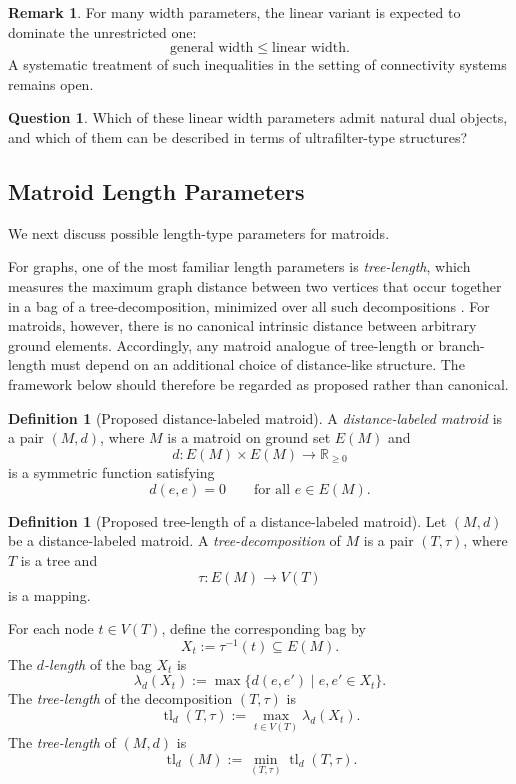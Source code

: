 \documentclass[10pt]{book}
\theoremstyle{definition}
\newtheorem{remark}[theorem]{Remark}
\newtheorem{definition}[theorem]{Definition}
\newtheorem{question}[theorem]{Question}
\begin{document}
\begin{remark}
For many width parameters, the linear variant is expected to dominate the unrestricted one:
\[
\text{general width} \leq \text{linear width}.
\]
A systematic treatment of such inequalities in the setting of connectivity systems remains open.
\end{remark}

\begin{question}
Which of these linear width parameters admit natural dual objects, and which of them can be described in terms of ultrafilter-type structures?
\end{question}

\subsection{Matroid Length Parameters}

We next discuss possible length-type parameters for matroids.

For graphs, one of the most familiar length parameters is \emph{tree-length}, which measures the maximum graph distance between two vertices that occur together in a bag of a tree-decomposition, minimized over all such decompositions \cite{coudert2016approximate,dourisboure2004compact,dourisboure2007spanners}.
For matroids, however, there is no canonical intrinsic distance between arbitrary ground elements.
Accordingly, any matroid analogue of tree-length or branch-length must depend on an additional choice of distance-like structure.
The framework below should therefore be regarded as proposed rather than canonical.

\begin{definition}[Proposed distance-labeled matroid]
A \emph{distance-labeled matroid} is a pair \((M,d)\), where \(M\) is a matroid on ground set \(E(M)\) and
\[
d:E(M)\times E(M)\to \mathbb{R}_{\ge 0}
\]
is a symmetric function satisfying
\[
d(e,e)=0
\qquad
\text{for all } e\in E(M).
\]
\end{definition}

\begin{definition}[Proposed tree-length of a distance-labeled matroid]
Let \((M,d)\) be a distance-labeled matroid.
A \emph{tree-decomposition} of \(M\) is a pair \((T,\tau)\), where \(T\) is a tree and
\[
\tau:E(M)\to V(T)
\]
is a mapping.

For each node \(t\in V(T)\), define the corresponding bag by
\[
X_t:=\tau^{-1}(t)\subseteq E(M).
\]
The \emph{\(d\)-length} of the bag \(X_t\) is
\[
\lambda_d(X_t):=\max\{d(e,e')\mid e,e'\in X_t\}.
\]
The \emph{tree-length} of the decomposition \((T,\tau)\) is
\[
\operatorname{tl}_d(T,\tau):=
\max_{t\in V(T)} \lambda_d(X_t).
\]
The \emph{tree-length} of \((M,d)\) is
\[
\operatorname{tl}_d(M):=
\min_{(T,\tau)} \operatorname{tl}_d(T,\tau).
\]
\end{definition}
\end{document}
